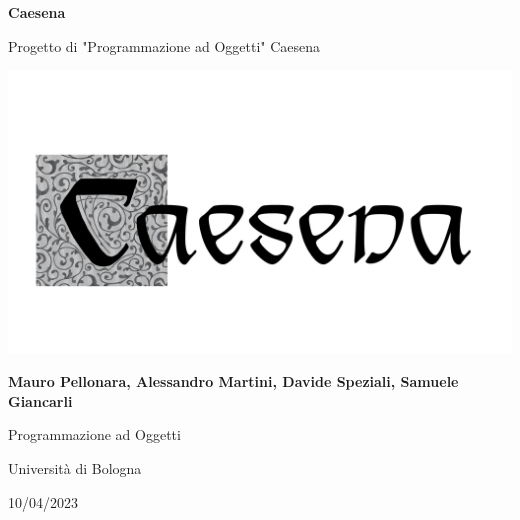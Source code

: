 \documentclass[italian, a4paper, 12pt]{article}
\begin{document}
\begin{titlepage}
    \begin{center}
        \vspace*{1cm}
        
        \textbf{\Huge Caesena}

        \vspace{1cm}

        {\LARGE Progetto di "Programmazione ad Oggetti" Caesena}

        \vfill

        {\includegraphics[scale=.42]{images/caesena.png}}

        \vfill

        \textbf{\Large Mauro Pellonara, Alessandro Martini, Davide Speziali, Samuele Giancarli}
        
        \vspace{1cm}
        
        {\large Programmazione ad Oggetti}
        
        \vspace{0.3cm}

        {\large Università di Bologna}
        
        \vspace{0.3cm}
        
        {\large 10/04/2023}
    \end{center}
\end{titlepage}

\tableofcontents
\newpage


\clearpage

\clearpage

\clearpage

\clearpage

\clearpage

\clearpage

\end{document}
